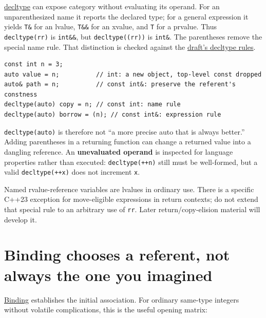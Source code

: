 \hyperref[appendix-5d4252a42886]{decltype} can expose category without evaluating its operand. For an unparenthesized name it reports the declared type; for a general expression it yields \texttt{T\&} for an lvalue, \texttt{T\&\&} for an xvalue, and \texttt{T} for a prvalue. Thus \texttt{decltype(rr)} is \texttt{int\&\&}, but \texttt{decltype((rr))} is \texttt{int\&}. The parentheses remove the special name rule. That distinction is checked against the \href{https://eel.is/c++draft/dcl.type.decltype}{draft's decltype rules}.

\begin{verbatim}
const int n = 3;
auto value = n;          // int: a new object, top-level const dropped
auto& path = n;          // const int&: preserve the referent's constness
decltype(auto) copy = n; // const int: name rule
decltype(auto) borrow = (n); // const int&: expression rule
\end{verbatim}

\texttt{decltype(auto)} is therefore not ``a more precise auto that is always better.'' Adding parentheses in a returning function can change a returned value into a dangling reference. An \textbf{unevaluated operand} is inspected for language properties rather than executed: \texttt{decltype(++n)} still must be well-formed, but a valid \texttt{decltype(++x)} does not increment \texttt{x}.

Named rvalue-reference variables are lvalues in ordinary use. There is a specific C++23 exception for move-eligible expressions in return contexts; do not extend that special rule to an arbitrary use of \texttt{rr}. Later return/copy-elision material will develop it.

\section{Binding chooses a referent, not always the one you imagined}\label{05-engine-i-ch003-binding-chooses-a-referent-not-always-the-one-you-imagined}

\hyperref[appendix-37856d997bb0]{Binding} establishes the initial association. For ordinary same-type integers without volatile complications, this is the useful opening matrix:

